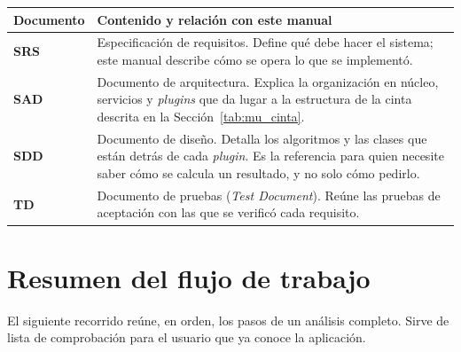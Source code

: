 \documentclass[11pt,a4paper]{article}
\begin{document}
\begin{center}
\small
\begin{tabularx}{\textwidth}{|p{}|X|}
\hline
\textbf{Documento} & \textbf{Contenido y relaci\'on con este manual} \\
\hline
\textbf{SRS} & Especificaci\'on de requisitos. Define qu\'e debe hacer el sistema; este manual describe c\'omo se opera lo que se implement\'o. \\
\hline
\textbf{SAD} & Documento de arquitectura. Explica la organizaci\'on en n\'ucleo, servicios y \textit{plugins} que da lugar a la estructura de la cinta descrita en la Secci\'on~\ref{tab:mu_cinta}. \\
\hline
\textbf{SDD} & Documento de dise\~no. Detalla los algoritmos y las clases que est\'an detr\'as de cada \textit{plugin}. Es la referencia para quien necesite saber c\'omo se calcula un resultado, y no solo c\'omo pedirlo. \\
\hline
\textbf{TD} & Documento de pruebas (\emph{Test Document}). Re\'une las pruebas de aceptaci\'on con las que se verific\'o cada requisito. \\
\hline
\end{tabularx}
\label{tab:mu_documentos}
\end{center}

\clearpage

\appendix

\section{Resumen del flujo de trabajo}

El siguiente recorrido re\'une, en orden, los pasos de un an\'alisis completo. Sirve de lista de comprobaci\'on para el usuario que ya conoce la aplicaci\'on.
\end{document}
